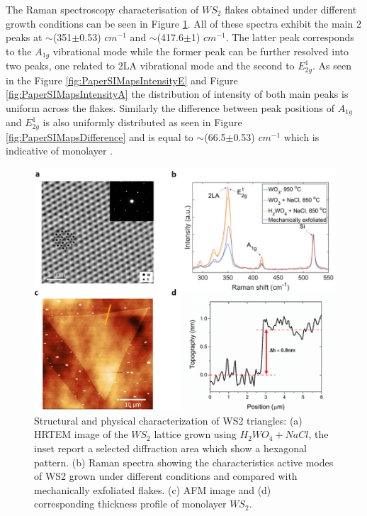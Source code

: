 \documentclass[12pt]{article}
\begin{document}
The Raman spectroscopy characterisation of $WS_2$ flakes obtained under different growth conditions can be seen in Figure \ref{fig:PaperAFM}. All of these spectra exhibit the main 2 peaks at {$\sim$}(351{$\pm$}0.53) $cm^{−1}$ and {$\sim$}(417.6{$\pm$}1) $cm^{−1}$. The latter peak corresponds to the $A_{1g}$ vibrational mode while the former peak can be further resolved into two peaks, one related to 2LA vibrational mode and the second to $E^1_{2g}$. As seen in the Figure \ref{fig:PaperSIMapsIntensityE} and Figure \ref{fig:PaperSIMapsIntensityA} the distribution of intensity of both main peaks is uniform across the flakes. Similarly the difference between peak positions of $A_{1g}$ and $E^1_{2g}$ is also uniformly distributed as seen in Figure \ref{fig:PaperSIMapsDifference} and is equal to {$\sim$}(66.5{$\pm$}0.53) $cm^{−1}$ which is indicative of monolayer \cite{Withers2014}.

\begin{figure}[h]
\begin{center}
\includegraphics[scale=0.3]{PaperAFM.png}
\caption{Structural and physical characterization of WS2 triangles: (a) HRTEM image of the $WS_2$ lattice grown using $H_2WO_4+NaCl$, the inset report a selected diffraction area which show a hexagonal pattern. (b) Raman spectra showing the characteristics active modes of WS2 grown under different conditions and compared with mechanically exfoliated flakes. (c) AFM image and (d) corresponding thickness profile of monolayer $WS_2$.}
\label{fig:PaperAFM}
\end{center}
\end{figure}
\end{document}
